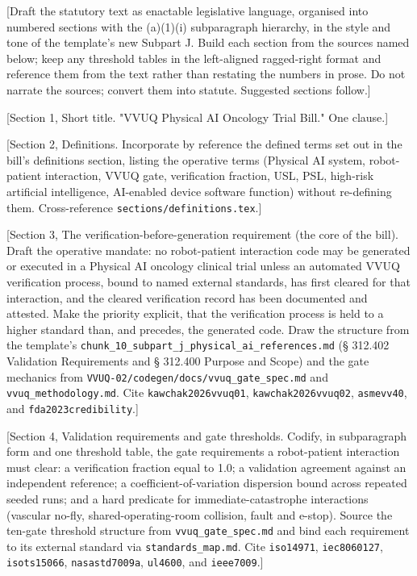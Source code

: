 
[Draft the statutory text as enactable legislative language, organised into
numbered sections with the (a)(1)(i) subparagraph hierarchy, in the style and tone
of the template's new Subpart J. Build each section from the sources named below;
keep any threshold tables in the left-aligned ragged-right format and reference
them from the text rather than restating the numbers in prose. Do not narrate the
sources; convert them into statute. Suggested sections follow.]

[Section 1, Short title. "VVUQ Physical AI Oncology Trial Bill." One clause.]

[Section 2, Definitions. Incorporate by reference the defined terms set out in the
bill's definitions section, listing the operative terms (Physical AI system,
robot-patient interaction, VVUQ gate, verification fraction, USL, PSL, high-risk
artificial intelligence, AI-enabled device software function) without re-defining
them. Cross-reference \texttt{sections/definitions.tex}.]

[Section 3, The verification-before-generation requirement (the core of the bill).
Draft the operative mandate: no robot-patient interaction code may be generated or
executed in a Physical AI oncology clinical trial unless an automated VVUQ
verification process, bound to named external standards, has first cleared for
that interaction, and the cleared verification record has been documented and
attested. Make the priority explicit, that the verification process is held to a
higher standard than, and precedes, the generated code. Draw the structure from
the template's \texttt{chunk\_10\_subpart\_j\_physical\_ai\_references.md}
(§ 312.402 Validation Requirements and § 312.400 Purpose and Scope) and the gate
mechanics from \texttt{VVUQ-02/codegen/docs/vvuq\_gate\_spec.md} and
\texttt{vvuq\_methodology.md}. Cite \texttt{kawchak2026vvuq01},
\texttt{kawchak2026vvuq02}, \texttt{asmevv40}, and \texttt{fda2023credibility}.]

[Section 4, Validation requirements and gate thresholds. Codify, in subparagraph
form and one threshold table, the gate requirements a robot-patient interaction
must clear: a verification fraction equal to 1.0; a validation agreement against an
independent reference; a coefficient-of-variation dispersion bound across repeated
seeded runs; and a hard predicate for immediate-catastrophe interactions (vascular
no-fly, shared-operating-room collision, fault and e-stop). Source the ten-gate
threshold structure from \texttt{vvuq\_gate\_spec.md} and bind each requirement to
its external standard via \texttt{standards\_map.md}. Cite \texttt{iso14971},
\texttt{iec8060127}, \texttt{isots15066}, \texttt{nasastd7009a}, \texttt{ul4600},
and \texttt{ieee7009}.]

